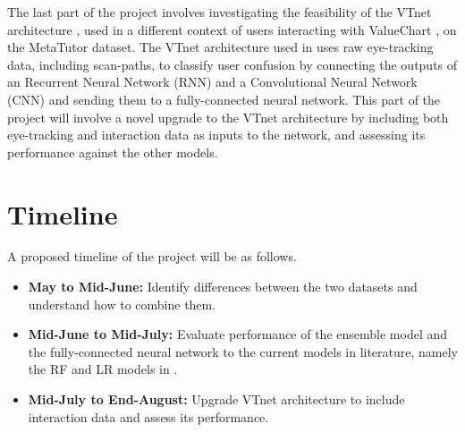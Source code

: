 \documentclass[11pt,letterpaper]{article}
\begin{document}
The last part of the project involves investigating the feasibility of the VTnet architecture \autocite{sims2020neural}, used in a different context of users interacting with ValueChart \autocite{carenini2004valuecharts}, on the MetaTutor dataset. The VTnet architecture used in \autocite{sims2020neural} uses raw eye-tracking data, including scan-paths, to classify user confusion by connecting the outputs of an Recurrent Neural Network (RNN) and a Convolutional Neural Network (CNN) and sending them to a fully-connected neural network. This part of the project will involve a novel upgrade to the VTnet architecture by including both eye-tracking and interaction data as inputs to the network, and assessing its performance against the other models.

\section{Timeline}

A proposed timeline of the project will be as follows.

\begin{itemize}
    \item \textbf{May to Mid-June:} Identify differences between the two datasets and understand how to combine them.

    \item \textbf{Mid-June to Mid-July:} Evaluate performance of the ensemble model and the fully-connected neural network to the current models in literature, namely the RF and LR models in \autocite{lalle2021predict}.

    \item \textbf{Mid-July to End-August:} Upgrade VTnet architecture to include interaction data and assess its performance.

\end{itemize}

\printbibliography
\end{document}
